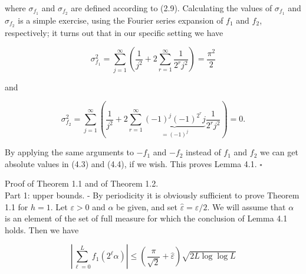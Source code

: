 \documentclass[10pt]{article}
\begin{document}
where $\sigma_{f_{1}}$ and $\sigma_{f_{2}}$ are defined according to (2.9). Calculating the values of $\sigma_{f_{1}}$ and $\sigma_{f_{2}}$ is a simple exercise, using the Fourier series expansion of $f_{1}$ and $f_{2}$, respectively; it turns out that in our specific setting we have


\begin{equation*}
\sigma_{f_{1}}^{2}=\sum_{j=1}^{\infty}\left(\frac{1}{j^{2}}+2 \sum_{r=1}^{\infty} \frac{1}{2^{r} j^{2}}\right)=\frac{\pi^{2}}{2} \tag{4.5}
\end{equation*}


and


\begin{equation*}
\sigma_{f_{2}}^{2}=\sum_{j=1}^{\infty}(\frac{1}{j^{2}}+2 \sum_{r=1}^{\infty} \underbrace{(-1)^{j}(-1)^{2^{r}} j}_{=(-1)^{j}} \frac{1}{2^{r} j^{2}})=0 . \tag{4.6}
\end{equation*}


By applying the same arguments to $-f_{1}$ and $-f_{2}$ instead of $f_{1}$ and $f_{2}$ we can get absolute values in (4.3) and (4.4), if we wish. This proves Lemma 4.1. \(\square\)

Proof of Theorem 1.1 and of Theorem 1.2.\\
Part 1: upper bounds. - By periodicity it is obviously sufficient to prove Theorem 1.1 for $h=1$. Let $\varepsilon>0$ and $\alpha$ be given, and set $\hat{\varepsilon}=\varepsilon / 2$. We will assume that $\alpha$ is an element of the set of full measure for which the conclusion of Lemma 4.1 holds. Then we have


\begin{equation*}
\left|\sum_{\ell=0}^{L} f_{1}\left(2^{\ell} \alpha\right)\right| \leqslant\left(\frac{\pi}{\sqrt{2}}+\hat{\varepsilon}\right) \sqrt{2 L \log \log L} \tag{4.7}
\end{equation*}
\end{document}
